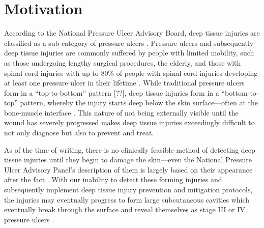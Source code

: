 	\section{Motivation}
		According to the National Pressure Ulcer Advisory Board, deep tissue injuries are classified as a sub-category of pressure ulcers \cite{black11}. Pressure ulcers and subsequently deep tissue injuries are commonly suffered by people with limited mobility, such as those undergoing lengthy surgical procedures, the elderly, and those with spinal cord injuries \cite{allman95} with up to \unit{80}{\%} of people with spinal cord injuries developing at least one pressure ulcer in their lifetime \cite{salzberg96}. While traditional pressure ulcers form in a ``top-to-bottom'' pattern [??], deep tissue injuries form in a ``bottom-to-top'' pattern, whereby the injury starts deep below the skin surface---often at the bone-muscle interface \cite{kanno09}. This nature of not being externally visible until the wound has severely progressed makes deep tissue injuries exceedingly difficult to not only diagnose but also to prevent and treat.

		As of the time of writing, there is no clinically feasible method of detecting deep tissue injuries until they begin to damage the skin---even the National Pressure Ulcer Advisory Panel's description of them is largely based on their appearance after the fact \cite{npuap07}. With our inability to detect these forming injuries and subsequently implement deep tissue injury prevention and mitigation protocols, the injuries may eventually progress to form large subcutaneous cavities which eventually break through the surface and reveal themselves as stage III or IV pressure ulcers \cite{bouten03,oomens10}. 

